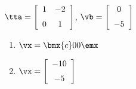 {$\tta = \left[ \begin {array}{cc} 1&-2\\\noalign{\medskip}0&1\end {array}
 \right]$, $\vb=\left[ \begin {array}{c} 0\\\noalign{\medskip}-5\end {array} \right]$}
{\begin{enumerate}
\item	 $\vx=\bmx{c}0\\0\emx$
\item	 $\vx=\left[ \begin {array}{c} -10\\\noalign{\medskip}-5\end {array}
\right]$
\end{enumerate}
 }







